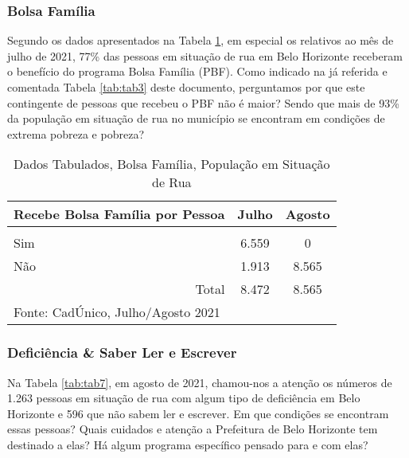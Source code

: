 \documentclass[12pt]{article}
\begin{document}
\subsubsection{Bolsa Família}

Segundo os dados apresentados na Tabela \ref{tab:tab6}, em especial os relativos ao mês de julho de 2021, 77\% das pessoas em situação de rua em Belo Horizonte receberam o benefício do programa Bolsa Família (PBF). Como indicado na já referida e comentada Tabela \ref{tab:tab3} deste documento, perguntamos por que este contingente de pessoas que recebeu o PBF não é maior? Sendo que mais de 93\% da população em situação de rua no município se encontram em condições de extrema pobreza e pobreza?\\

\begin{table}[htbp]
  \centering
  \caption{Dados Tabulados, Bolsa Família, População em Situação de Rua}
    \begin{tabular}{p{23.5em}rr}
    \hline
    \multicolumn{1}{c}{Recebe Bolsa Família por Pessoa} & \multicolumn{1}{c}{Julho} & \multicolumn{1}{c}{Agosto} \\
    \midrule
    \multicolumn{1}{c}{} &      &  \\
    \multicolumn{1}{l}{Sim} & \multicolumn{1}{c}{6.559} & \multicolumn{1}{c}{0} \\
    \multicolumn{1}{l}{Não} & \multicolumn{1}{c}{1.913} & \multicolumn{1}{c}{8.565} \\
    \midrule
    \multicolumn{1}{r}{Total} & \multicolumn{1}{c}{8.472} & \multicolumn{1}{c}{8.565} \\
    \midrule
    Fonte: CadÚnico, Julho/Agosto 2021 &      &  \\
    \end{tabular}%
  \label{tab:tab6}%
\end{table}%

\subsubsection{Deficiência \& Saber Ler e Escrever}

Na Tabela \ref{tab:tab7}, em agosto de 2021, chamou-nos a atenção os números de 1.263 pessoas em situação de rua com algum tipo de deficiência em Belo Horizonte e 596 que não sabem ler e escrever. Em que condições se encontram essas pessoas? Quais cuidados e atenção a Prefeitura de Belo Horizonte tem destinado a elas? Há algum programa específico pensado para e com elas?\\
\end{document}
